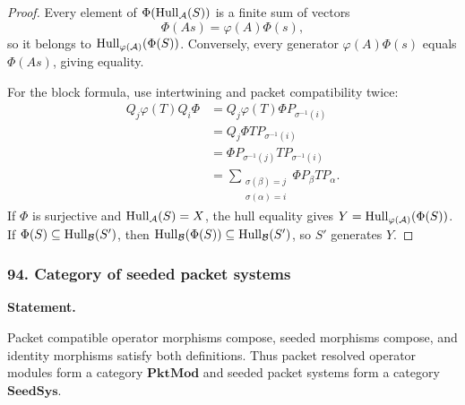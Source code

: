 \begin{proof}
Every element of $\Phi(\operatorname{Hull}_{\mathcal A}(S))$ is a finite sum of vectors
\[
\Phi(As)=\varphi(A)\Phi(s),
\]
so it belongs to $\operatorname{Hull}_{\varphi(\mathcal A)}(\Phi(S))$.  Conversely, every generator $\varphi(A)\Phi(s)$ equals $\Phi(As)$, giving equality.

For the block formula, use intertwining and packet compatibility twice:
\begin{align*}
Q_j\varphi(T)Q_i\Phi
&=Q_j\varphi(T)\Phi P_{\sigma^{-1}(i)}\\
&=Q_j\Phi TP_{\sigma^{-1}(i)}\\
&=\Phi P_{\sigma^{-1}(j)}TP_{\sigma^{-1}(i)}\\
&=\sum_{\substack{\sigma(\beta)=j\\\sigma(\alpha)=i}}
\Phi P_\beta TP_\alpha.
\end{align*}
If $\Phi$ is surjective and $\operatorname{Hull}_{\mathcal A}(S)=X$, the hull equality gives $Y=\operatorname{Hull}_{\varphi(\mathcal A)}(\Phi(S))$.  If $\Phi(S)\subseteq\operatorname{Hull}_{\mathcal B}(S')$, then $\operatorname{Hull}_{\mathcal B}(\Phi(S))\subseteq\operatorname{Hull}_{\mathcal B}(S')$, so $S'$ generates $Y$.
\end{proof}
\subsubsection*{94. Category of seeded packet systems}
\label{rec:PSC-I-P-SEED-SYSTEM-CATEGORY}
\textbf{Statement.}\par
Packet compatible operator morphisms compose, seeded morphisms compose, and identity morphisms satisfy both definitions.  Thus packet resolved operator modules form a category $\mathbf{PktMod}$ and seeded packet systems form a category $\mathbf{SeedSys}$.

